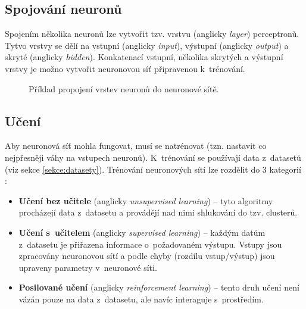 \subsection*{Spojování neuronů}
Spojením několika neuronů lze vytvořit tzv. vrstvu (anglicky \emph{layer}) perceptronů. Tytvo vrstvy se dělí na vstupní (anglicky \emph{input}), výstupní (anglicky \emph{output}) a skryté (anglicky \emph{hidden}). Konkatenací vstupní, několika skrytých a výstupní vrstvy je možno vytvořit neuronovou síť připravenou k~trénování.

\begin{figure}[H]
  \begin{center}
  \label{obrazek:nsexample}
  \caption{Příklad propojení vrstev neuronů do neuronové sítě.}
  \end{center}
\end{figure}

\subsection*{Učení}
Aby neuronová síť mohla fungovat, musí se natrénovat (tzn. nastavit co nejpřesněji váhy na vstupech neuronů). K~trénování se používají data z~datasetů (viz sekce \ref{sekce:datasety}). Trénování neuronových sítí lze rozdělit do 3 kategorií \cite{deeplearningbook}:

\begin{itemize}
  \item \textbf{Učení bez učitele} (anglicky \emph{unsupervised learning}) -- tyto algoritmy procházejí data z~datasetu a provádějí nad nimi shlukování do tzv. clusterů.
  \item \textbf{Učení s~učitelem} (anglicky \emph{supervised learning}) -- každým datům z~datasetu je přiřazena informace o~požadovaném výstupu. Vstupy jsou zpracovány neuronovou sítí a podle chyby (rozdílu vstup/výstup) jsou upraveny parametry v~neuronové síti.
  \item \textbf{Posilované učení} (anglicky \emph{reinforcement learning}) -- tento druh učení není vázán pouze na data z~datasetu, ale navíc interaguje s~prostředím.
\end{itemize}

